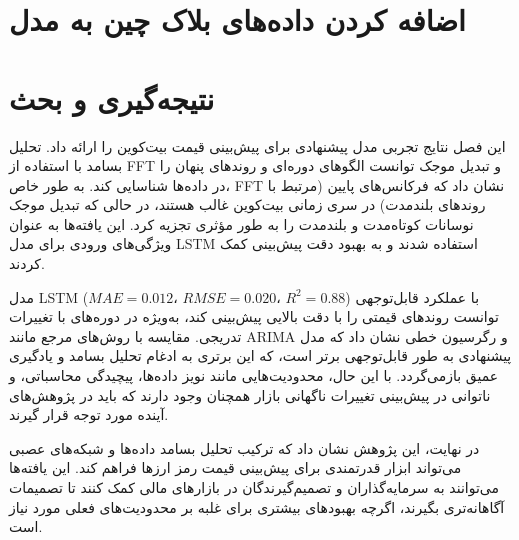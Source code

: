\section{اضافه کردن داده‌های بلاک چین به مدل}


\section{نتیجه‌گیری و بحث}
\label{sec:results_conclusion}
این فصل نتایج تجربی مدل پیشنهادی برای پیش‌بینی قیمت بیت‌کوین را ارائه داد. تحلیل بسامد با استفاده از FFT و تبدیل موجک توانست الگوهای دوره‌ای و روندهای پنهان را در داده‌ها شناسایی کند. به طور خاص، FFT نشان داد که فرکانس‌های پایین (مرتبط با روندهای بلندمدت) در سری زمانی بیت‌کوین غالب هستند، در حالی که تبدیل موجک نوسانات کوتاه‌مدت و بلندمدت را به طور مؤثری تجزیه کرد. این یافته‌ها به عنوان ویژگی‌های ورودی برای مدل LSTM استفاده شدند و به بهبود دقت پیش‌بینی کمک کردند.

مدل LSTM با عملکرد قابل‌توجهی ($ MAE = 0.012،\,\, RMSE = 0.020،\,\, R^2 = 0.88 $)  توانست روندهای قیمتی را با دقت بالایی پیش‌بینی کند، به‌ویژه در دوره‌های با تغییرات تدریجی. مقایسه با روش‌های مرجع مانند ARIMA و رگرسیون خطی نشان داد که مدل پیشنهادی به طور قابل‌توجهی برتر است، که این برتری به ادغام تحلیل بسامد و یادگیری عمیق بازمی‌گردد. با این حال، محدودیت‌هایی مانند نویز داده‌ها، پیچیدگی محاسباتی، و ناتوانی در پیش‌بینی تغییرات ناگهانی بازار همچنان وجود دارند که باید در پژوهش‌های آینده مورد توجه قرار گیرند.

در نهایت، این پژوهش نشان داد که ترکیب تحلیل بسامد داده‌ها و شبکه‌های عصبی می‌تواند ابزار قدرتمندی برای پیش‌بینی قیمت رمز ارزها فراهم کند. این یافته‌ها می‌توانند به سرمایه‌گذاران و تصمیم‌گیرندگان در بازارهای مالی کمک کنند تا تصمیمات آگاهانه‌تری بگیرند، اگرچه بهبودهای بیشتری برای غلبه بر محدودیت‌های فعلی مورد نیاز است.
